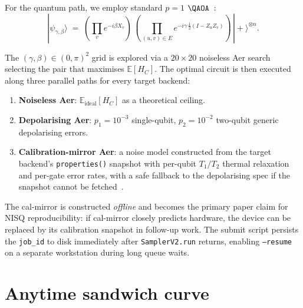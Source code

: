 \documentclass{article}
\begin{document}
\begin{sloppypar}
For the quantum path, we employ standard $p{=}1$ $\QAOA$~\cite{farhi2014quantum,wang2018quantum}:
\begin{equation}
  |\psi_{\gamma,\beta}\rangle
  \;=\;
  \left(\prod_{v} e^{-i \beta X_v}\right)\,
  \left(\prod_{(u,v) \in E}\! e^{-i \gamma\, \tfrac12 (I - Z_u Z_v)}\right)
  \,|+\rangle^{\otimes n}.
\end{equation}
\end{sloppypar}
The $(\gamma, \beta) \in (0, \pi)^2$ grid is explored via a $20 \times 20$
noiseless Aer search selecting the pair that maximises
$\mathbb{E}[H_C]$. The optimal circuit is then executed along three
parallel paths for every target backend:
\begin{enumerate}
  \item \textbf{Noiseless Aer}: $\mathbb{E}_{\text{ideal}}[H_C]$ as a
        theoretical ceiling.
  \item \textbf{Depolarising Aer}: $p_1 = 10^{-3}$ single-qubit,
        $p_2 = 10^{-2}$ two-qubit generic depolarising errors.
  \item \textbf{Calibration-mirror Aer}: a noise model constructed from the
        target backend's \texttt{properties()} snapshot with per-qubit
        $T_1/T_2$ thermal relaxation and per-gate error rates, with a safe
        fallback to the depolarising spec if the snapshot cannot be
        fetched~\cite{xue2021effects}.
\end{enumerate}
The cal-mirror is constructed \emph{offline} and becomes the primary
paper claim for NISQ reproducibility: if cal-mirror closely predicts
hardware, the device can be replaced by its calibration snapshot in
follow-up work. The submit script persists the \texttt{job\_id} to disk
immediately after \texttt{SamplerV2.run} returns, enabling
\texttt{--resume} on a separate workstation during long queue waits.

\section{Anytime sandwich curve}
\label{sec:anytime}
\end{document}
